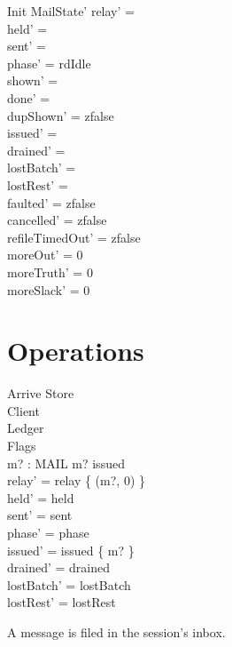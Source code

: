 \documentclass[a4paper,10pt,fleqn]{article}
\begin{document}
\begin{schema}{Init}
  MailState'
  \where
  relay' = \emptyset \\
  held' = \emptyset \\
  sent' = \emptyset \\
  phase' = rdIdle \\
  shown' = \emptyset \\
  done' = \emptyset \\
  dupShown' = zfalse \\
  issued' = \emptyset \\
  drained' = \emptyset \\
  lostBatch' = \emptyset \\
  lostRest' = \emptyset \\
  faulted' = zfalse \\
  cancelled' = zfalse \\
  refileTimedOut' = zfalse \\
  moreOut' = 0 \\
  moreTruth' = 0 \\
  moreSlack' = 0
\end{schema}

\section{Operations}

\begin{schema}{Arrive}
  \Delta Store \\
  \Xi Client \\
  \Delta Ledger \\
  \Xi Flags \\
  m? : MAIL
  \where
  m? \notin issued \\
  relay' = relay \cup \{ (m?, 0) \} \\
  held' = held \\
  sent' = sent \\
  phase' = phase \\
  issued' = issued \cup \{ m? \} \\
  drained' = drained \\
  lostBatch' = lostBatch \\
  lostRest' = lostRest
\end{schema}

A message is filed in the session's inbox.
\end{document}
